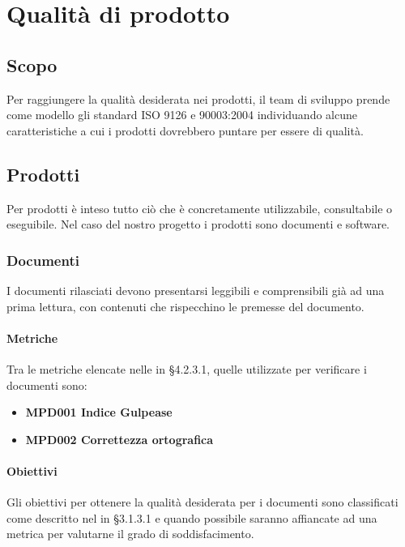 \section{Qualità di prodotto}

\subsection{Scopo}
Per raggiungere la qualità desiderata nei prodotti, il team di sviluppo prende come modello gli standard ISO 9126 e 90003:2004 individuando alcune caratteristiche a cui i prodotti dovrebbero puntare per essere di qualità.

\subsection{Prodotti}
Per prodotti è inteso tutto ciò che è concretamente utilizzabile, consultabile o eseguibile. Nel caso del nostro progetto i prodotti sono documenti e software.
	\subsubsection{Documenti}
	I documenti rilasciati devono presentarsi leggibili e comprensibili già ad una prima lettura, con contenuti che rispecchino le premesse del documento.

		\paragraph{Metriche}
		Tra le metriche elencate nelle \Doc{\NdP} in  §4.2.3.1, quelle utilizzate per verificare i documenti sono:
		
		\begin{itemize}
			\item \textbf{MPD001 Indice Gulpease}
			\item \textbf{MPD002 Correttezza ortografica}
		\end{itemize} 
		
		\paragraph{Obiettivi}
		Gli obiettivi per ottenere la qualità desiderata per i documenti sono classificati come descritto nel \Doc{\NdP} in §3.1.3.1 e quando possibile saranno affiancate ad una metrica per valutarne il grado di soddisfacimento.
		
